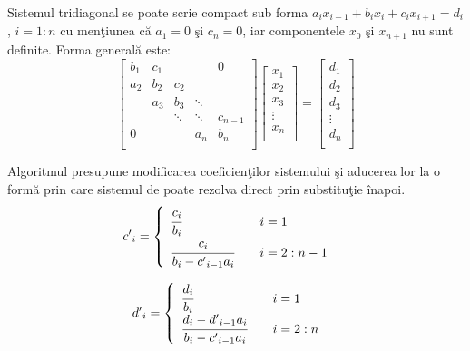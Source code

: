 \documentclass{exam}
\begin{document}
Sistemul tridiagonal se poate scrie compact sub forma $a_i x_{i-1} + b_i x_i + c_i x_{i+1} = d_i$, $i=1:n$ cu men\c{t}iunea c\u{a} $a_1=0$ \c{s}i $c_n = 0$, iar componentele $x_0$ \c{s}i $x_{n+1}$ nu sunt definite. Forma general\u{a} este:
$$\begin{bmatrix}
		{b_1} & {c_1} & {   }  & {   }  & { 0 }     \\
		{a_2} & {b_2} & {c_2}  & {   }  & {   }     \\
		{   } & {a_3} & {b_3}  & \ddots & {   }     \\
		{   } & {   } & \ddots & \ddots & {c_{n-1}} \\
		{ 0 } & {   } & {   }  & {a_n}  & {b_n}     \\
	\end{bmatrix}
	\begin{bmatrix}
		{x_1 } \\
		{x_2 } \\
		{x_3 } \\
		\vdots \\
		{x_n } \\
	\end{bmatrix}
	=
	\begin{bmatrix}
		{d_1 } \\
		{d_2 } \\
		{d_3 } \\
		\vdots \\
		{d_n } \\
	\end{bmatrix}
$$

\par Algoritmul presupune modificarea coeficien\c{t}ilor sistemului \c{s}i aducerea lor la o form\u{a} prin care sistemul de poate rezolva direct prin substitu\c{t}ie \^{i}napoi.
$$c\rq{}_i =
	\begin{cases}
		\begin{array}{lcl}
			\cfrac{c_i}{b_i}                      &  & i = 1     \\
			\cfrac{c_i}{b_i - c\rq{}_{i - 1} a_i} &  & i = 2:n-1 \\
		\end{array}
	\end{cases}
$$

$$d\rq{}_i =
	\begin{cases}
		\begin{array}{lcl}
			\cfrac{d_i}{b_i}                                           &  & i = 1   \\
			\cfrac{d_i - d\rq{}_{i - 1} a_i}{b_i - c\rq{}_{i - 1} a_i} &  & i = 2:n \\
		\end{array}
	\end{cases}
$$
\end{document}
